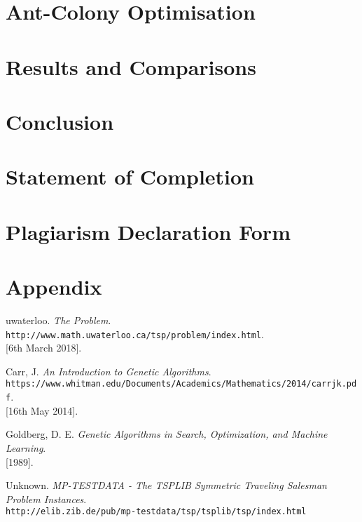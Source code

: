 \documentclass[11pt,a4paper,final]{article}
\begin{document}
	\section{Ant-Colony Optimisation}
	\label{ACO}
	
	\section{Results and Comparisons}
	\label{Results}
	
	\section{Conclusion}
	\label{Conc}
	
	\section{Statement of Completion}
	\label{SoC}
	
	\section{Plagiarism Declaration Form}
	\label{PlagForm}
	
	\section{Appendix}
	\label{Appendix}
	
	\pagebreak
	\begin{thebibliography}{9}
		uwaterloo.
		\textit{The Problem}.
		\\\texttt{http://www.math.uwaterloo.ca/tsp/problem/index.html}.
		\\{[6th March 2018]}.
		
		Carr, J.
		\textit{An Introduction to Genetic Algorithms}.
		\\\texttt{https://www.whitman.edu/Documents/Academics/Mathematics/2014/carrjk.pdf}.
		\\{[16th May 2014]}.
		
		Goldberg, D. E.
		\textit{Genetic Algorithms in Search, Optimization, and Machine
			Learning}.
		\\{[1989]}.
		
		Unknown.
		\textit{MP-TESTDATA - The TSPLIB Symmetric Traveling Salesman Problem Instances}.
		\\\texttt{http://elib.zib.de/pub/mp-testdata/tsp/tsplib/tsp/index.html}
		
	\end{thebibliography}	
\end{document}
